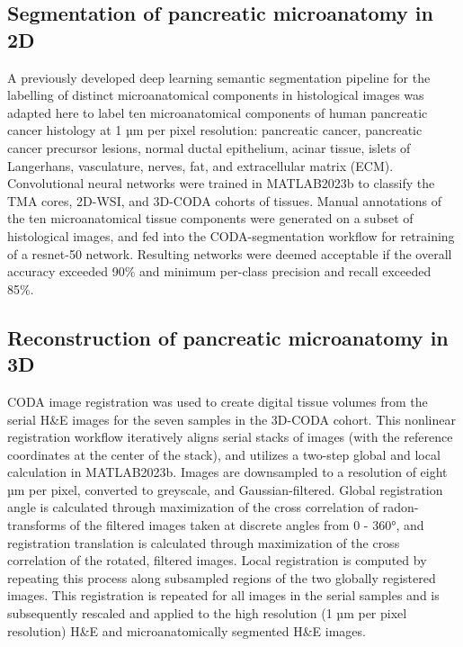 \begin{refsection}
    \subsection{Segmentation of pancreatic microanatomy in 2D}
    A previously developed deep learning semantic segmentation pipeline for the labelling of distinct microanatomical components in histological images was adapted here to label ten microanatomical components of human pancreatic cancer histology at 1 µm per pixel resolution: pancreatic cancer, pancreatic cancer precursor lesions, normal ductal epithelium, acinar tissue, islets of Langerhans, vasculature, nerves, fat, and extracellular matrix (ECM)\cite{Kiemen2022CODA,Chen2016DeepLab}. Convolutional neural networks were trained in MATLAB2023b to classify the TMA cores, 2D-WSI, and 3D-CODA cohorts of tissues. Manual annotations of the ten microanatomical tissue components were generated on a subset of histological images, and fed into the CODA-segmentation workflow for retraining of a resnet-50 network. Resulting networks were deemed acceptable if the overall accuracy exceeded 90\% and minimum per-class precision and recall exceeded 85\%.
    
    \subsection{Reconstruction of pancreatic microanatomy in 3D}
    CODA image registration was used to create digital tissue volumes from the serial H\&E images for the seven samples in the 3D-CODA cohort\cite{Kiemen2022CODA}. This nonlinear registration workflow iteratively aligns serial stacks of images (with the reference coordinates at the center of the stack), and utilizes a two-step global and local calculation in MATLAB2023b. Images are downsampled to a resolution of eight µm per pixel, converted to greyscale, and Gaussian-filtered. Global registration angle is calculated through maximization of the cross correlation of radon-transforms of the filtered images taken at discrete angles from 0 - 360°, and registration translation is calculated through maximization of the cross correlation of the rotated, filtered images. Local registration is computed by repeating this process along subsampled regions of the two globally registered images. This registration is repeated for all images in the serial samples and is subsequently rescaled and applied to the high resolution (1 µm per pixel resolution) H\&E and microanatomically segmented H\&E images.
    

\end{refsection}
